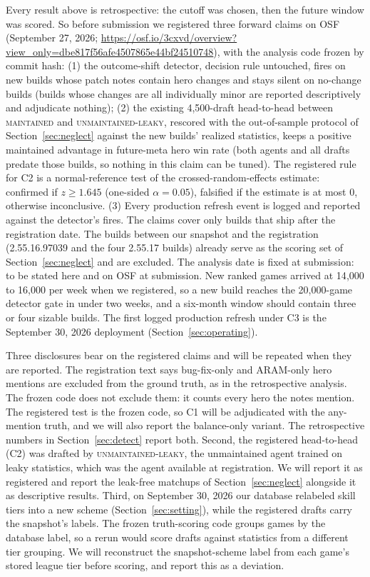 \documentclass[journal]{IEEEtran}
\newcommand{\preregdate}{September 27, 2026}
\newcommand{\prereglink}{\url{https://osf.io/3cxvd/overview?view_only=dbe817f56afe4507865e44bf24510748}}
\newcommand{\prereglink}{\url{https://osf.io/3cxvd}}
\newcommand{\maintained}{\textsc{maintained}}          %
\newcommand{\leakyunm}{\textsc{unmaintained-leaky}}     %
\newcommand{\analysisdate}{to be stated here and on OSF at submission}
\begin{document}
Every result above is retrospective: the cutoff was chosen, then the
future window was scored. So before submission we registered three
forward claims on OSF (\preregdate{}; \prereglink{}), with the analysis
code frozen by commit hash: (1) the outcome-shift detector, decision
rule untouched, fires on new builds whose patch notes contain hero
changes and stays silent on no-change builds (builds whose changes are
all individually minor are reported descriptively and adjudicate
nothing); (2) the existing 4{,}500-draft head-to-head between \maintained{}
and \leakyunm{}, rescored with the out-of-sample protocol of
Section~\ref{sec:neglect} against the new builds' realized statistics,
keeps a positive maintained advantage in future-meta hero win rate
(both agents and all drafts predate those builds, so nothing in this
claim can be tuned). The registered rule for C2 is a normal-reference
test of the crossed-random-effects estimate: confirmed if
$z \geq 1.645$ (one-sided $\alpha = 0.05$), falsified if the estimate is
at most 0, otherwise inconclusive. (3) Every production refresh event is logged and reported
against the detector's fires. The claims cover only builds that ship
after the registration date. The builds between our snapshot and the
registration (2.55.16.97039 and the four 2.55.17 builds) already serve as
the scoring set of Section~\ref{sec:neglect} and are excluded. The
analysis date is fixed at submission: \analysisdate{}. New ranked games
arrived at 14{,}000 to 16{,}000 per week when we registered, so a new
build reaches the 20{,}000-game detector gate in under two weeks, and a
six-month window should contain three or four sizable builds. The first
logged production refresh under C3 is the September 30, 2026 deployment
(Section~\ref{sec:operating}).

Three disclosures bear on the registered claims and will be repeated
when they are reported. The registration text says bug-fix-only and ARAM-only
hero mentions are excluded from the ground truth, as in the
retrospective analysis. The frozen code does not exclude them: it counts
every hero the notes mention. The registered test is the frozen code, so
C1 will be adjudicated with the any-mention truth, and we will also
report the balance-only variant. The retrospective numbers in
Section~\ref{sec:detect} report both. Second, the registered
head-to-head (C2) was drafted by \leakyunm{}, the unmaintained agent
trained on leaky statistics, which was the agent available at
registration. We will report it as registered and report the leak-free
matchups of Section~\ref{sec:neglect} alongside it as descriptive
results. Third, on September 30, 2026 our database relabeled skill tiers
into a new scheme (Section~\ref{sec:setting}), while the registered
drafts carry the snapshot's labels. The frozen truth-scoring code groups
games by the database label, so a rerun would score drafts against
statistics from a different tier grouping. We will reconstruct the
snapshot-scheme label from each game's stored league tier before
scoring, and report this as a deviation.
\end{document}
